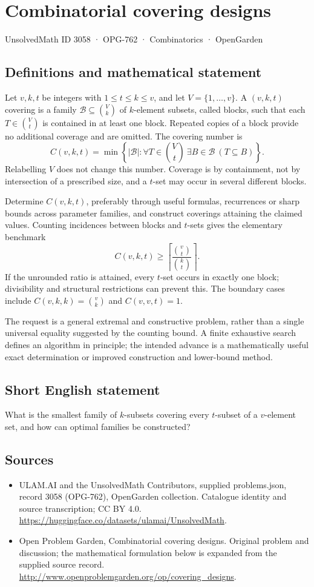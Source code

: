 \documentclass[11pt,a4paper]{article}
\begin{document}
\section*{Combinatorial covering designs}\label{3058}
{\small UnsolvedMath ID 3058 · OPG-762 · Combinatorics · OpenGarden}
\subsection{Definitions and mathematical statement}
Let $v,k,t$ be integers with $1\le t\le k\le v$, and let
$V=\{1,\ldots,v\}$. A $(v,k,t)$ covering is a family
$\mathcal B\subseteq\binom Vk$ of $k$-element subsets, called blocks,
such that each $T\in\binom Vt$ is contained in at least one block.
Repeated copies of a block provide no additional coverage and are omitted.
The covering number is
\[
 C(v,k,t)=\min\left\{|\mathcal B|:
 \forall T\in\binom Vt\ \exists B\in\mathcal B\ (T\subseteq B)\right\}.
\]
Relabelling $V$ does not change this number. Coverage is by containment,
not by intersection of a prescribed size, and a $t$-set may occur in
several different blocks.

Determine $C(v,k,t)$, preferably through useful formulas, recurrences or
sharp bounds across parameter families, and construct coverings attaining
the claimed values. Counting incidences between blocks and $t$-sets gives
the elementary benchmark
\[
 C(v,k,t)\ge
 \left\lceil\frac{\binom vt}{\binom kt}\right\rceil.
\]
If the unrounded ratio is attained, every $t$-set occurs in exactly one
block; divisibility and structural restrictions can prevent this.
The boundary cases include $C(v,k,k)=\binom vk$ and $C(v,v,t)=1$.

The request is a general extremal and constructive problem, rather than
a single universal equality suggested by the counting bound. A finite
exhaustive search defines an algorithm in principle; the intended advance
is a mathematically useful exact determination or improved construction
and lower-bound method.
\subsection{Short English statement}
What is the smallest family of $k$-subsets covering every $t$-subset of a $v$-element set, and how can optimal families be constructed?
\subsection{Sources}
\begin{itemize}
\item[S1] ULAM.AI and the UnsolvedMath Contributors, supplied problems.json, record 3058 (OPG-762), OpenGarden collection. Catalogue identity and source transcription; CC BY 4.0.
\url{https://huggingface.co/datasets/ulamai/UnsolvedMath}.
\item[S2] Open Problem Garden, Combinatorial covering designs. Original problem and discussion; the mathematical formulation below is expanded from the supplied source record.
\url{http://www.openproblemgarden.org/op/covering_designs}.
\end{itemize}
\end{document}

